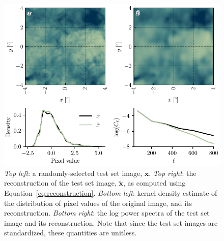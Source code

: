 \documentclass[fleqn,usenatbib]{mnras}
\begin{document}
\begin{figure}
    \centering
    \includegraphics{ ./panelplot.pdf}
    \caption{\emph{Top left}: a randomly-selected test set image, $\mathbf x$. \emph{Top right}: the reconstruction of the test set image, $\tilde{\mathbf x}$, as computed using Equation~\ref{eq:reconstruction}. \emph{Bottom left}: kernel density estimate of the distribution of pixel values of the original image, and its reconstruction. \emph{Bottom right}: the log power spectra of the test set image and its reconstruction. Note that since the test set images are standardized, these quantities are unitless.}
    \label{fig:panel_plot}
\end{figure}
\end{document}
